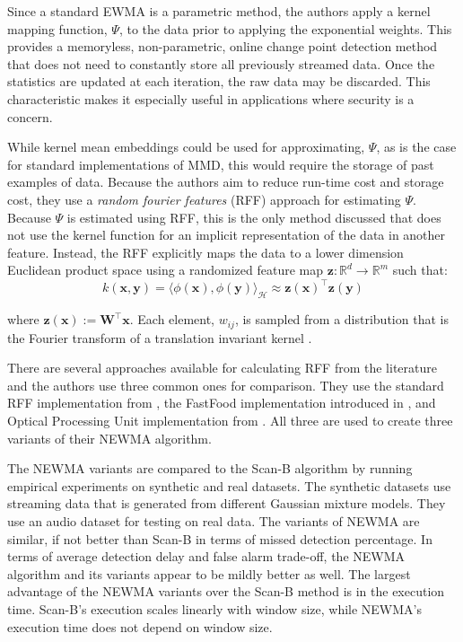 Since a standard EWMA is a parametric method, the authors apply a kernel mapping function, $\Psi$, to the data prior to applying the exponential weights. This provides a memoryless, non-parametric, online change point detection method that does not need to constantly store all previously streamed data. Once the statistics are updated at each iteration, the raw data may be discarded. This characteristic makes it especially useful in applications where security is a concern.

While kernel mean embeddings could be used for approximating, $\Psi$, as is the case for standard implementations of MMD, this would require the storage of past examples of data. Because the authors aim to reduce run-time cost and storage cost, they use a \textit{random fourier features} (RFF) approach for estimating $\Psi$. Because $\Psi$  is estimated using RFF, this is the only method discussed that does not use the kernel function for an implicit representation of the data in another feature. Instead, the RFF explicitly maps the data to a lower dimension Euclidean product space using a randomized feature map $\mathbf{z}: \mathbb{R}^d \rightarrow \mathbb{R}^m$ such that:
\begin{equation}
k(\mathbf{x}, \mathbf{y})=\langle\phi(\mathbf{x}), \phi(\mathbf{y})\rangle_{\mathcal{H}} \approx \mathbf{z}(\mathbf{x})^{\top} \mathbf{z}(\mathbf{y})
\end{equation}

where $\mathbf{z}(\mathbf{x}):=\mathbf{W}^{\top} \mathbf{x}$. Each element, $w_{ij}$, is sampled from a distribution that is the Fourier transform of a translation invariant kernel \cite{rahimi2008random}.

There are several approaches available for calculating RFF from the literature and the authors use three common ones for comparison. They use the standard RFF implementation from \cite{rahimi2008random}, the FastFood implementation introduced in \cite{le2014fastfood}, and Optical Processing Unit implementation from \cite{saade2016random}. All three are used to create three variants of their NEWMA algorithm.

The NEWMA variants are compared to the Scan-B algorithm by running empirical experiments on synthetic and real datasets. The synthetic datasets use streaming data that is generated from different Gaussian mixture models. They use an audio dataset for testing on real data. The variants of NEWMA are similar, if not better than Scan-B in terms of missed detection percentage. In terms of average detection delay and false alarm trade-off, the NEWMA algorithm and its variants appear to be mildly better as well. The largest advantage of the NEWMA variants over the Scan-B method is in the execution time. Scan-B's execution scales linearly with window size, while NEWMA's execution time does not depend on window size.

